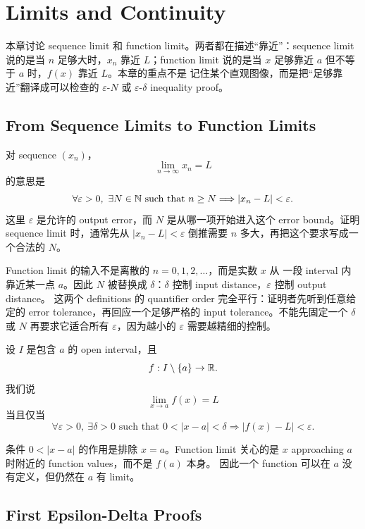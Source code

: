 \chapter{Limits and Continuity}

本章讨论 sequence limit 和 function limit。两者都在描述“靠近”：sequence limit
说的是当 \(n\) 足够大时，\(x_n\) 靠近 \(L\)；function limit 说的是当
\(x\) 足够靠近 \(a\) 但不等于 \(a\) 时，\(f(x)\) 靠近 \(L\)。本章的重点不是
记住某个直观图像，而是把“足够靠近”翻译成可以检查的
\(\varepsilon\)-\(N\) 或 \(\varepsilon\)-\(\delta\) inequality proof。

\section{From Sequence Limits to Function Limits}

对 sequence \((x_n)\)，
\[
  \lim_{n\to\infty}x_n=L
\]
的意思是
\[
  \forall \varepsilon>0,\ \exists N\in\mathbb{N}
  \text{ such that } n\geq N \Longrightarrow |x_n-L|<\varepsilon.
\]
这里 \(\varepsilon\) 是允许的 output error，而 \(N\) 是从哪一项开始进入这个
error bound。证明 sequence limit 时，通常先从
\(|x_n-L|<\varepsilon\) 倒推需要 \(n\) 多大，再把这个要求写成一个合法的
\(N\)。

Function limit 的输入不是离散的 \(n=0,1,2,\ldots\)，而是实数 \(x\) 从
一段 interval 内靠近某一点 \(a\)。因此 \(N\) 被替换成 \(\delta\)：\(\delta\)
控制 input distance，\(\varepsilon\) 控制 output distance。
这两个 definitions 的 quantifier order 完全平行：证明者先听到任意给定的
error tolerance，再回应一个足够严格的 input tolerance。不能先固定一个
\(\delta\) 或 \(N\) 再要求它适合所有 \(\varepsilon\)，因为越小的
\(\varepsilon\) 需要越精细的控制。

\begin{definition}
设 \(I\) 是包含 \(a\) 的 open interval，且
\[
  f:I\setminus\{a\}\to\mathbb{R}.
\]
我们说
\[
  \lim_{x\to a}f(x)=L
\]
当且仅当
\[
  \forall \varepsilon>0,\ \exists \delta>0
  \text{ such that }
  0<|x-a|<\delta \Longrightarrow |f(x)-L|<\varepsilon.
\]
\end{definition}

条件 \(0<|x-a|\) 的作用是排除 \(x=a\)。Function limit 关心的是
\(x\) approaching \(a\) 时附近的 function values，而不是 \(f(a)\) 本身。
因此一个 function 可以在 \(a\) 没有定义，但仍然在 \(a\) 有 limit。

\section{First Epsilon-Delta Proofs}

